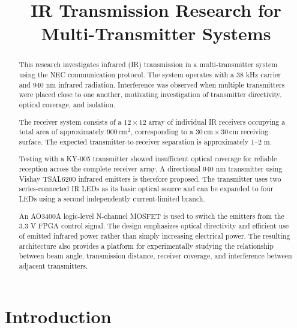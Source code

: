\documentclass[a4paper,12pt]{article}
\title{\textbf{IR Transmission Research for Multi-Transmitter Systems}}
\author{}
\date{}
\begin{document}
\maketitle


\begin{abstract}

This research investigates infrared (IR) transmission in a
multi-transmitter system using the NEC communication protocol.
The system operates with a 38 kHz carrier and 940 nm infrared radiation.
Interference was observed when multiple transmitters were placed close
to one another, motivating investigation of transmitter directivity,
optical coverage, and isolation.

The receiver system consists of a \(12 \times 12\) array of individual
IR receivers occupying a total area of approximately
\(900\,\text{cm}^2\), corresponding to a
\(30\,\text{cm} \times 30\,\text{cm}\) receiving surface.
The expected transmitter-to-receiver separation is approximately
1--2 m.

Testing with a KY-005 transmitter showed insufficient optical coverage
for reliable reception across the complete receiver array.
A directional 940 nm transmitter using Vishay TSAL6200 infrared
emitters is therefore proposed. The transmitter uses two series-connected
IR LEDs as its basic optical source and can be expanded to four LEDs
using a second independently current-limited branch.

An AO3400A logic-level N-channel MOSFET is used to switch the emitters
from the 3.3 V FPGA control signal. The design emphasizes optical
directivity and efficient use of emitted infrared power rather than
simply increasing electrical power. The resulting architecture also
provides a platform for experimentally studying the relationship between
beam angle, transmission distance, receiver coverage, and interference
between adjacent transmitters.

\end{abstract}



\section{Introduction}
\end{document}
